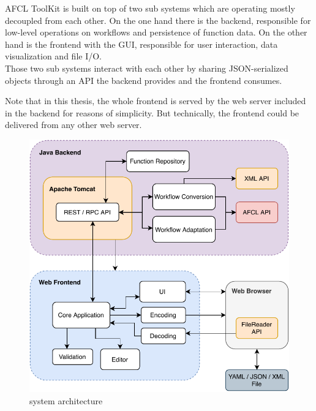 \documentclass[a4paper,12pt,pdftex,halfparskip,cleardoubleempty,bibtotoc,liststotoc]{scrbook}
\begin{document}


AFCL ToolKit is built on top of two sub systems which are operating mostly decoupled from each other. On the one hand there is the backend, responsible for low-level operations on workflows and persistence of function data. On the other hand is the frontend with the GUI, responsible for user interaction, data visualization and file I/O.\\
Those two sub systems interact with each other by sharing JSON-serialized objects through an API the backend provides and the frontend consumes.

Note that in this thesis, the whole frontend is served by the web server included in the backend for reasons of simplicity. But technically, the frontend could be delivered from any other web server.

\begin{figure}[H]
  \centering
  \vspace{0.8cm}
  \includegraphics{architecture}
  \caption{system architecture}
\end{figure}
\end{document}
